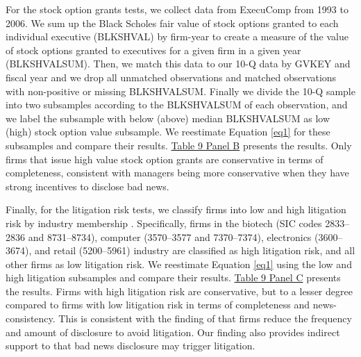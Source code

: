 \documentclass[letterpaper,12pt]{article}
\begin{document}
\begin{spacing}{1.5}
For the stock option grants tests, we collect data from ExecuComp from 1993 to 2006. We sum up the Black Scholes fair value of stock options granted to each individual executive (BLKSHVAL) by firm-year to create a measure of the value of stock options granted to executives for a given firm in a given year (BLKSHVALSUM). Then, we match this data to our 10-Q data by GVKEY and fiscal year and we drop all unmatched observations and matched observations with non-positive or missing BLKSHVALSUM. Finally we divide the 10-Q sample into two subsamples according to the BLKSHVALSUM of each observation, and we label the subsample with below (above) median BLKSHVALSUM as low (high) stock option value subsample. We reestimate Equation \eqref{eq1} for these subsamples and compare their results. \hyperref[T9]{Table 9 Panel B} presents the results. Only firms that issue high value stock option grants are conservative in terms of completeness, consistent with managers being more conservative when they have strong incentives to disclose bad news.

Finally, for the litigation risk tests, we classify firms into low and high litigation risk by industry membership \cite{francisShareholderLitigationCorporate1994,kimMeasuringSecuritiesLitigation2012}. Specifically, firms in the biotech (SIC codes 2833–2836 and 8731–8734), computer (3570–3577 and 7370–7374), electronics (3600–3674), and retail (5200–5961) industry are classified as high litigation risk, and all other firms as low litigation risk. We reestimate Equation \eqref{eq1} using the low and high litigation subsamples and compare their results. \hyperref[T9]{Table 9 Panel C} presents the results. Firms with high litigation risk are conservative, but to a lesser degree compared to firms with low litigation risk in terms of completeness and news-consistency. This is consistent with the finding of  that firms reduce the frequency and amount of disclosure to avoid litigation. Our finding also provides indirect support to  that bad news disclosure may trigger litigation.

\begin{comment}
\subsection{Bundling}
Using 8-K filings from 2005 to 2013, \citeA{segalAreManagersStrategic2016} find that managers strategically report negative news after trading hours when they believe that investor attention is low, and that firms bundle good and bad news disclosure to mitigate the negative impact of the latter. Consistent with \citeA{segalAreManagersStrategic2016}, \citeA{niessnerStrategicDisclosureTiming2015} find that managers systematically disclose bad news when investors are more distracted, and that this strategic disclosure of bad news is often accompanied with insider trading and earnings management. In sum, strategic delay or timing of bad news disclosure distorts the market and brings undesirable economic consequences.
\end{comment}



\end{spacing}
\end{document}
